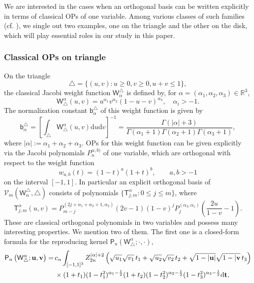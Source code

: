 \documentclass{amsart}
\theoremstyle{remark}
\def\d{\mathrm{d}}
\def\sb{{\mathsf b}}
\def\sP{{\mathsf P}}
\def\sT{{\mathsf T}}
\def\sW{{\mathsf W}}
\def\a{{\alpha}}
\def\tb{{\mathbf t}}
\def\ub{{\mathbf u}}
\def\vb{{\mathbf v}}
\def\CV{{\mathcal V}}
\def\RR{{\mathbb R}}
\def\f{\frac}
\begin{document}
We are interested in the cases when an orthogonal basis can be written explicitly in terms of classical OPs of
one variable. Among various classes of such families (cf. \cite{DX, K}), we single out two examples, one on the 
triangle and the other on the disk, which will play essential roles in our study in this paper. 

\subsubsection{Classical OPs on triangle}
On the triangle 
$$
   \triangle = \{(u,v): u \ge 0, v \ge 0, u+v \le 1\},
$$
the classical Jacobi weight function $\sW_{\a}^\triangle$ is defined by, for $\a = (\a_1,\a_2,\a_3)\in \RR^3$,
\begin{equation}\label{eq:Jacobi-w}
     \sW^{\a}_\triangle(u,v) = u^{\a_1} v^{\a_2} (1-u-v)^{\a_3}, \quad \a_i > -1.
\end{equation}
The normalization constant  $\sb^\triangle_{\a}$ of this weight function is given by 
\begin{equation}
   \sb^\triangle_{\a} = \left[ \int_\triangle  \sW^{\a}_\triangle(u,v) \d u \d v \right]^{-1} = \frac{\Gamma(|\a|+3)}{\Gamma(\a_1+1)\Gamma(\a_2+1)\Gamma(\a_3+1)},
\end{equation}
where $|\a|:= \a_1+\a_2+\a_3$. OPs for this weight function can be given explicitly via the Jacobi polynomials
$P_n^{\a,b)}$ of one variable, 
which are orthogonal with respect to the weight function 
$$
   w_{a,b}(t) = (1-t)^a ( 1+ t)^b, \qquad a, b > -1
$$
on the interval $[-1,1]$. In particular an explicit orthogonal basis of $\CV_m(\sW_{\a}^\triangle, \triangle)$ consists of 
polynomials $\{\sT_{j,m}^{\a}: 0 \le j \le m\}$, where \cite[Section 2.4]{DX} 
\begin{equation}\label{eq:triOP}
  \sT_{j,m}^{\a} (u,v) = P_{m-j}^{(2j+ \a_1+\a_3+1,\a_2)}(2 v -1) (1-v)^j P_j^{(\a_3,\a_1)}\left( \frac{2u}{1-v} -1\right).
\end{equation}  
These are classical orthogonal polynomials in two variables and possess many interesting properties. We mention
two of them. The first one is a closed-form formula for the reproducing kernel $\sP_n(\sW^{\a}_\triangle; \cdot,\cdot)$, 
 \begin{align} \label{eq:reprodT}
   \sP_n\left(\sW^{\a}_\triangle; \ub, \vb\right) = \,& c_\a  
       \int_{[-1,1]^3} Z_{2n}^{|\a|+2} \left(\sqrt{u_1}\sqrt{v_1}\, t_1 +\sqrt{u_2}\sqrt{v_2}\, t_2 + \sqrt{1-|\ub|}\sqrt{1-|\vb}\, t_3\right) 
       \notag \\
         & \times (1+t_1)(1-t_1^2)^{\a_1-\f12} (1+t_2) (1-t_2^2)^{\a_2-\f12}(1-t_3^2)^{\a_3-\f12} \d \tb,
\end{align} 
\end{document}
